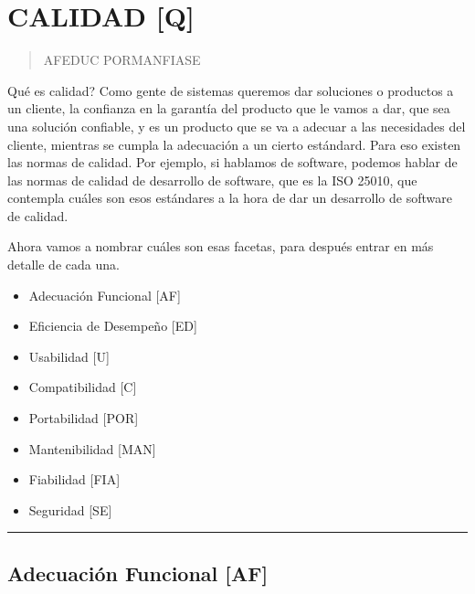 
\hypertarget{calidad-q}{%
\section{CALIDAD {[}Q{]}}\label{calidad-q}}

\twocolumn
\begin{quote}
AFEDUC PORMANFIASE
\end{quote}

Qué es calidad? Como gente de sistemas queremos dar soluciones o
productos a un cliente, la confianza en la garantía del producto que le
vamos a dar, que sea una solución confiable, y es un producto que se va
a adecuar a las necesidades del cliente, mientras se cumpla la
adecuación a un cierto estándard. Para eso existen las normas de
calidad. Por ejemplo, si hablamos de software, podemos hablar de las
normas de calidad de desarrollo de software, que es la ISO 25010, que
contempla cuáles son esos estándares a la hora de dar un desarrollo de
software de calidad.

Ahora vamos a nombrar cuáles son esas facetas, para después entrar en
más detalle de cada una.

\begin{itemize}

\item
  Adecuación Funcional {[}AF{]}
\item
  Eficiencia de Desempeño {[}ED{]}
\item
  Usabilidad {[}U{]}
\item
  Compatibilidad {[}C{]}
\item
  Portabilidad {[}POR{]}
\item
  Mantenibilidad {[}MAN{]}
\item
  Fiabilidad {[}FIA{]}
\item
  Seguridad {[}SE{]}
\end{itemize}

\begin{center}\rule{0.5\linewidth}{0.5pt}\end{center}

\hypertarget{adecuaciuxf3n-funcional-af}{%
\subsection{Adecuación Funcional
{[}AF{]}}\label{adecuaciuxf3n-funcional-af}}

